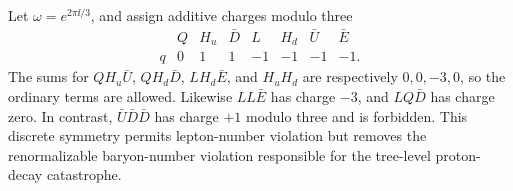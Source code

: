 \begin{enumerate}
\begin{enumerate}
    Let \(\omega=e^{2\pi \ii/3}\), and assign additive charges modulo three
      \[
      \begin{array}{c|ccccccc}
        &Q&H_u&\bar D&L&H_d&\bar U&\bar E\\ \hline
        q&0&1&1&-1&-1&-1&-1 .
      \end{array}
      \]
      The sums for \(QH_u\bar U\), \(QH_d\bar D\),
      \(LH_d\bar E\), and \(H_uH_d\) are respectively
      \(0,0,-3,0\), so the ordinary terms are allowed.  Likewise
      \(LL\bar E\) has charge \(-3\), and \(LQ\bar D\) has charge zero.
      In contrast,
      \(\bar U\bar D\bar D\) has charge \(+1\) modulo three and is
      forbidden.  This discrete symmetry permits lepton-number violation but
      removes the renormalizable baryon-number violation responsible for the
      tree-level proton-decay catastrophe.
  \end{enumerate}


\end{enumerate}
